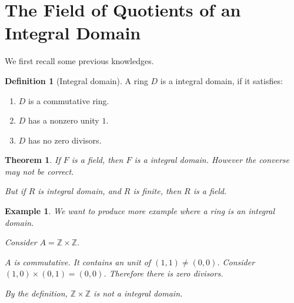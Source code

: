 \documentclass{article}
\theoremstyle{MyNonumberplain}
\theoremstyle{break}
\theoremstyle{break}
\newtheorem{theorem}{Theorem}[section]
\newtheorem{example}{Example}[section]
\theoremstyle{break}
\theoremstyle{definition}
\theoremstyle{break}
\newtheorem{definition}{Definition}[section]
\begin{document}
\section{The Field of Quotients of an Integral Domain}

We first recall some previous knowledges.

\begin{defbox}
    \begin{definition}[Integral domain]
        A ring $D$ is a integral domain, if it satisfies:\\
        \begin{enumerate}
          \item $D$ is a commutative ring.\bigskip
          
          \item $D$ has a nonzero unity $1$.\bigskip
          
          \item $D$ has no zero divisors.
        \end{enumerate}
    \end{definition}
\end{defbox}

\begin{thmbox}
    \begin{theorem}
        If $F$ is a field, then $F$ is a integral domain. However the converse may not
        be correct.\bigskip
        
        But if $R$ is integral domain, and $R$ is finite, then $R$ is a field.
    \end{theorem}
\end{thmbox}


\begin{expbox}
    \begin{example}
        We want to produce more example where a ring is an integral domain.\bigskip

        Consider $A =\mathbb{Z} \times \mathbb{Z}$.\bigskip
        
        $A$ is commutative. It contains an unit of $(1, 1) \neq (0, 0)$. Consider $(1,
        0) \times (0, 1) = (0, 0)$. Therefore there is zero divisors.\bigskip
        
        By the definition, $\mathbb{Z} \times \mathbb{Z}$ is not a integral domain. 
    \end{example}
\end{expbox}
\end{document}
